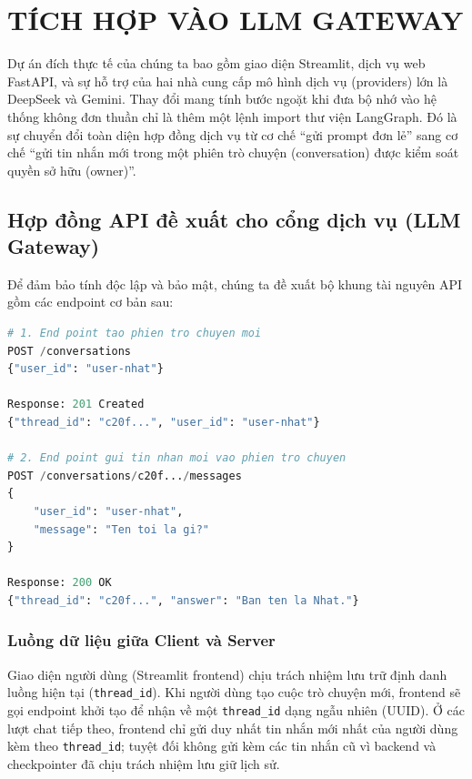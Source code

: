 \chapter{TÍCH HỢP VÀO LLM GATEWAY}
\label{chap:gateway-integration}

Dự án đích thực tế của chúng ta bao gồm giao diện Streamlit, dịch vụ web FastAPI, và sự hỗ trợ của hai nhà cung cấp mô hình dịch vụ (providers) lớn là DeepSeek và Gemini. Thay đổi mang tính bước ngoặt khi đưa bộ nhớ vào hệ thống không đơn thuần chỉ là thêm một lệnh import thư viện LangGraph. Đó là sự chuyển đổi toàn diện hợp đồng dịch vụ từ cơ chế ``gửi prompt đơn lẻ'' sang cơ chế ``gửi tin nhắn mới trong một phiên trò chuyện (conversation) được kiểm soát quyền sở hữu (owner)''.

\section{Hợp đồng API đề xuất cho cổng dịch vụ (LLM Gateway)}

Để đảm bảo tính độc lập và bảo mật, chúng ta đề xuất bộ khung tài nguyên API gồm các endpoint cơ bản sau:

\begin{lstlisting}[language=Python,caption={Tạo conversation và gửi message}]
# 1. End point tao phien tro chuyen moi
POST /conversations
{"user_id": "user-nhat"}

Response: 201 Created
{"thread_id": "c20f...", "user_id": "user-nhat"}

# 2. End point gui tin nhan moi vao phien tro chuyen
POST /conversations/c20f.../messages
{
    "user_id": "user-nhat",
    "message": "Ten toi la gi?"
}

Response: 200 OK
{"thread_id": "c20f...", "answer": "Ban ten la Nhat."}
\end{lstlisting}

\subsection{Luồng dữ liệu giữa Client và Server}
Giao diện người dùng (Streamlit frontend) chịu trách nhiệm lưu trữ định danh luồng hiện tại (\texttt{thread\_id}). Khi người dùng tạo cuộc trò chuyện mới, frontend sẽ gọi endpoint khởi tạo để nhận về một \texttt{thread\_id} dạng ngẫu nhiên (UUID). Ở các lượt chat tiếp theo, frontend chỉ gửi duy nhất tin nhắn mới nhất của người dùng kèm theo \texttt{thread\_id}; tuyệt đối không gửi kèm các tin nhắn cũ vì backend và checkpointer đã chịu trách nhiệm lưu giữ lịch sử.

